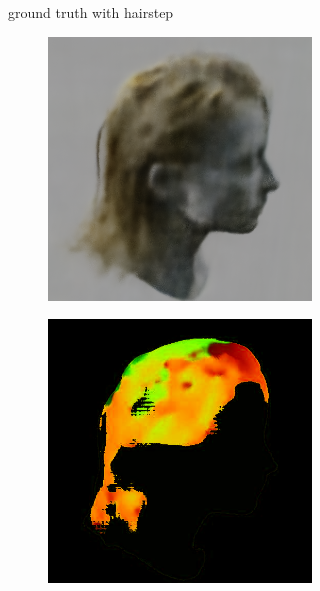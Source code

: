 \documentclass[12pt]{article}
\begin{document}
\begin{figure}[h]
\begin{subfigure}{0.48\textwidth}
\begin{subfigure}{0.48\textwidth}
        \end{subfigure}
        \caption{ground truth with hairstep}
    \end{subfigure}
    \hfill
    \begin{subfigure}{0.48\textwidth}
        \begin{subfigure}{0.48\textwidth}
            \centering
            \includegraphics[width=\textwidth]{./images/baseline-method/pred_6_nerf.png}
        \end{subfigure}
        \hfill
        \begin{subfigure}{0.48\textwidth}
            \centering
            \includegraphics[width=\textwidth]{./images/baseline-method/pred_6_hairstep.jpg}

\end{subfigure}
\end{subfigure}
\end{figure}
\end{document}
